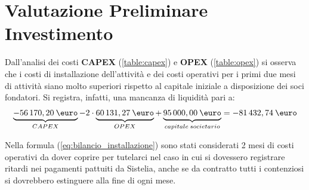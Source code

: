 \chapter[Valutazione Preliminare Investimento]{Valutazione Preliminare Investimento}
Dall'analisi dei costi \textbf{CAPEX} (\ref{table:capex}) e \textbf{OPEX} (\ref{table:opex}) si osserva che i costi di installazione dell'attività e dei costi operativi per i primi due mesi di attività siano molto superiori rispetto al capitale iniziale a disposizione dei soci fondatori. \newline
Si registra, infatti, una mancanza di liquidità pari a:
	\begin{equation}
	\label{eq:bilancio_installazione}
	\begin{split}
 		\underbrace{-56\thinspace 170,20 \: \mbox{\euro}}_{CAPEX} - 2 \cdot \underbrace{60\thinspace 131,27 \: \mbox{\euro}}_{OPEX} + \underbrace{95\thinspace 000,00 \: \mbox{\euro}}_{capitale \: societario} = -81\thinspace 432,74 \: \mbox{\euro}
 	\end{split}
	\end{equation}
	
	\begin{tcolorbox}[colframe=blue!75!black,adjusted title=\textbf{Osservazione!}]
		Nella formula (\ref{eq:bilancio_installazione}) sono stati considerati 2 mesi di costi operativi da dover coprire per tutelarci nel caso in cui si dovessero registrare ritardi nei pagamenti pattuiti da Sistelia, anche se da contratto tutti i contenziosi si dovrebbero estinguere alla fine di ogni mese.
	\end{tcolorbox}

